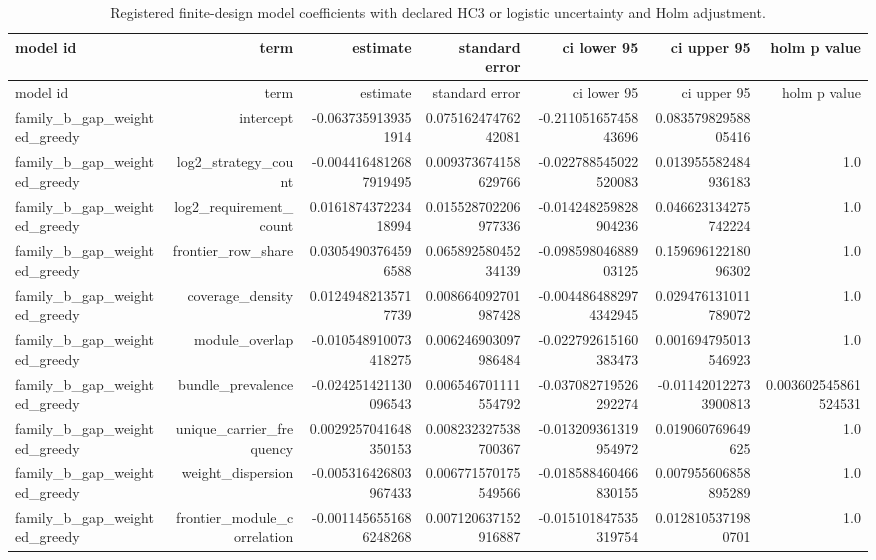 {\footnotesize
\begin{longtable}{lrrrrrr}
\caption{Registered finite-design model coefficients with declared HC3 or logistic uncertainty and Holm adjustment.}\label{tab:aor-registered-model-coefficients}\\
\toprule
model id & term & estimate & standard error & ci lower 95 & ci upper 95 & holm p value \\
\midrule
\endfirsthead
\toprule
model id & term & estimate & standard error & ci lower 95 & ci upper 95 & holm p value \\
\midrule
\endhead
family\_b\_gap\_weighted\_greedy & intercept & -0.0637359139351914 & 0.07516247476242081 & -0.21105165745843696 & 0.08357982958805416 &  \\
family\_b\_gap\_weighted\_greedy & log2\_strategy\_count & -0.0044164812687919495 & 0.009373674158629766 & -0.022788545022520083 & 0.013955582484936183 & 1.0 \\
family\_b\_gap\_weighted\_greedy & log2\_requirement\_count & 0.016187437223418994 & 0.015528702206977336 & -0.014248259828904236 & 0.046623134275742224 & 1.0 \\
family\_b\_gap\_weighted\_greedy & frontier\_row\_share & 0.03054903764596588 & 0.06589258045234139 & -0.09859804688903125 & 0.15969612218096302 & 1.0 \\
family\_b\_gap\_weighted\_greedy & coverage\_density & 0.01249482135717739 & 0.008664092701987428 & -0.0044864882974342945 & 0.029476131011789072 & 1.0 \\
family\_b\_gap\_weighted\_greedy & module\_overlap & -0.010548910073418275 & 0.006246903097986484 & -0.022792615160383473 & 0.001694795013546923 & 1.0 \\
family\_b\_gap\_weighted\_greedy & bundle\_prevalence & -0.024251421130096543 & 0.006546701111554792 & -0.037082719526292274 & -0.011420122733900813 & 0.003602545861524531 \\
family\_b\_gap\_weighted\_greedy & unique\_carrier\_frequency & 0.0029257041648350153 & 0.008232327538700367 & -0.013209361319954972 & 0.019060769649625 & 1.0 \\
family\_b\_gap\_weighted\_greedy & weight\_dispersion & -0.005316426803967433 & 0.006771570175549566 & -0.018588460466830155 & 0.007955606858895289 & 1.0 \\
family\_b\_gap\_weighted\_greedy & frontier\_module\_correlation & -0.0011456551686248268 & 0.007120637152916887 & -0.015101847535319754 & 0.0128105371980701 & 1.0 \\

\end{longtable}}
